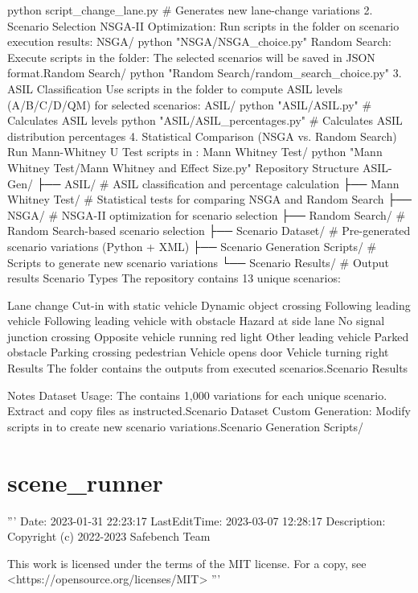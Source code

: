\begin{appendix}
python script\_change\_lane.py  \# Generates new lane-change variations
2. Scenario Selection
NSGA-II Optimization:
Run scripts in the folder on scenario execution results: NSGA/
python "NSGA/NSGA\_choice.py"
Random Search:
Execute scripts in the folder: The selected scenarios will be saved in JSON format.Random Search/
python "Random Search/random\_search\_choice.py"
3. ASIL Classification
Use scripts in the folder to compute ASIL levels (A/B/C/D/QM) for selected scenarios: ASIL/
python "ASIL/ASIL.py"  \# Calculates ASIL levels
python "ASIL/ASIL\_percentages.py"  \# Calculates ASIL distribution percentages
4. Statistical Comparison (NSGA vs. Random Search)
Run Mann-Whitney U Test scripts in : Mann Whitney Test/
python "Mann Whitney Test/Mann Whitney and Effect Size.py"
Repository Structure
ASIL-Gen/  
├── ASIL/                  \# ASIL classification and percentage calculation  
├── Mann Whitney Test/     \# Statistical tests for comparing NSGA and Random Search  
├── NSGA/                  \# NSGA-II optimization for scenario selection  
├── Random Search/         \# Random Search-based scenario selection  
├── Scenario Dataset/      \# Pre-generated scenario variations (Python + XML)  
├── Scenario Generation Scripts/  \# Scripts to generate new scenario variations  
└── Scenario Results/      \# Output results 
Scenario Types
The repository contains 13 unique scenarios:

Lane change
Cut-in with static vehicle
Dynamic object crossing
Following leading vehicle
Following leading vehicle with obstacle
Hazard at side lane
No signal junction crossing
Opposite vehicle running red light
Other leading vehicle
Parked obstacle
Parking crossing pedestrian
Vehicle opens door
Vehicle turning right
Results
The folder contains the outputs from executed scenarios.Scenario Results

Notes
Dataset Usage: The contains 1,000 variations for each unique scenario. Extract and copy files as instructed.Scenario Dataset
Custom Generation: Modify scripts in to create new scenario variations.Scenario Generation Scripts/

\section{scene\_runner}

''' 
Date: 2023-01-31 22:23:17
LastEditTime: 2023-03-07 12:28:17
Description: 
Copyright (c) 2022-2023 Safebench Team

This work is licensed under the terms of the MIT license.
For a copy, see <https://opensource.org/licenses/MIT>
'''


\end{appendix}
